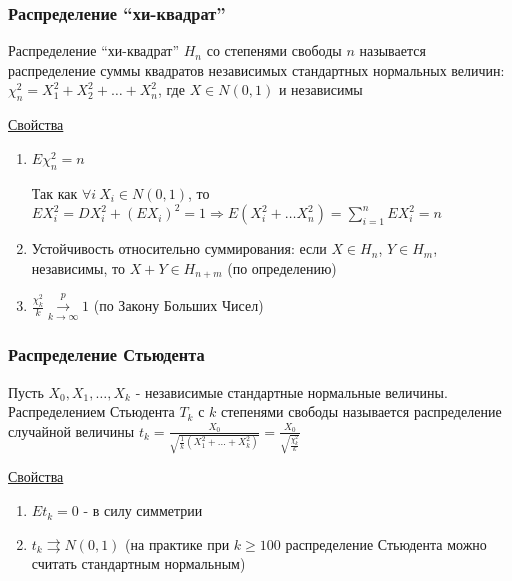 \documentclass[12pt]{article}
\begin{document}
\subsubsection{Распределение \enquote{хи-квадрат}}

\Def Распределение \enquote{хи-квадрат} $H_n$ со степенями свободы $n$ называется распределение
суммы квадратов независимых стандартных нормальных величин: $\chi^2_n = X_1^2 + X_2^2 + \dots + X_n^2$, 
где $X \in N(0, 1)$ и независимы

\underline{Свойства}

\begin{enumerate}
    \item $E\chi^2_n = n$

    \begin{MyProof}
        Так как $\forall i \ X_i \in N(0, 1)$, то $E X_i^2 = D X_i^2 + (EX_i)^2 = 1 \Longrightarrow E(X_i^2 + \dots X_n^2) = \sum_{i = 1}^n E X_i^2 = n$
    \end{MyProof}

    \item Устойчивость относительно суммирования: если $X \in H_n$, $Y \in H_m$, независимы, то $X + Y \in H_{n + m}$ (по определению) 


    \item $\frac{\chi_k^2}{k} \overset{p}{\underset{k \to \infty}{\longrightarrow}} 1$ (по Закону Больших Чисел)
\end{enumerate}

\subsubsection{Распределение Стьюдента}

\Def Пусть $X_0, X_1, \dots, X_k$ - независимые стандартные нормальные величины. 
Распределением Стьюдента $T_k$ с $k$ степенями свободы называется распределение случайной величины 
$t_k = \frac{X_0}{\sqrt{\frac{1}{k} (X_1^2 + \dots + X_k^2)}} = \frac{X_0}{\sqrt{\frac{\chi_k^2}{k}}}$

\underline{Свойства}

\begin{enumerate}
    \item $Et_k = 0$ - в силу симметрии

    \item $t_k \rightrightarrows N(0, 1)$ (на практике при $k \geq 100$ распределение Стьюдента можно считать стандартным нормальным)
\end{enumerate}
\end{document}
